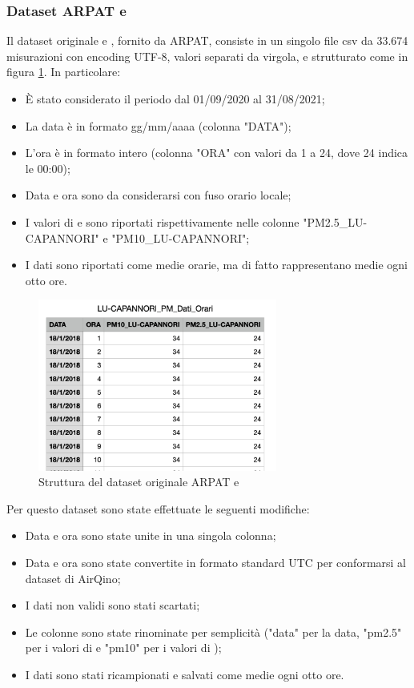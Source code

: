 \subsubsection{Dataset ARPAT  e }
Il dataset originale  e , fornito da ARPAT, consiste in un singolo file csv da 33.674 misurazioni con encoding UTF-8, valori separati da virgola, e strutturato come in figura \ref{fig:pm-arpat}. In particolare:
\begin{itemize}
  \item È stato considerato il periodo dal 01/09/2020 al 31/08/2021;
  \item La data è in formato gg/mm/aaaa (colonna "DATA");
  \item L'ora è in formato intero (colonna "ORA" con valori da 1 a 24, dove 24 indica le 00:00);
  \item Data e ora sono da considerarsi con fuso orario locale;
  \item I valori di  e  sono riportati rispettivamente nelle colonne "PM2.5\_LU-CAPANNORI" e "PM10\_LU-CAPANNORI";
  \item I dati sono riportati come medie orarie, ma di fatto rappresentano medie ogni otto ore.
\end{itemize}

\begin{figure}[H]
\centering
\captionsetup{justification=centering}
\includegraphics[width=0.7\textwidth,height=\textheight,keepaspectratio]{img/dataset_arpat_pm_prima.png}
\caption{Struttura del dataset originale ARPAT  e }
\label{fig:pm-arpat}
\end{figure}

Per questo dataset sono state effettuate le seguenti modifiche:
\begin{itemize}
  \item Data e ora sono state unite in una singola colonna;
  \item Data e ora sono state convertite in formato standard UTC per conformarsi al dataset di AirQino;
  \item I dati non validi sono stati scartati;
  \item Le colonne sono state rinominate per semplicità ("data" per la data, "pm2.5" per i valori di  e "pm10" per i valori di );
  \item I dati sono stati ricampionati e salvati come medie ogni otto ore.\\
\end{itemize}

